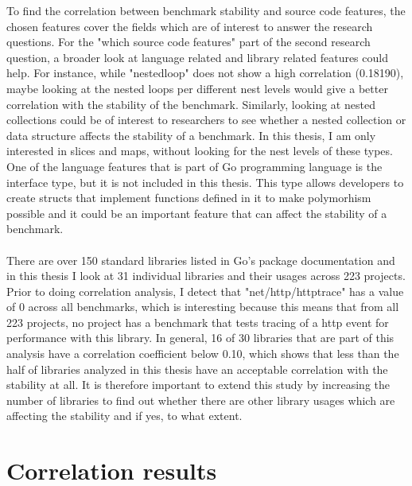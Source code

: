 \documentclass{seal_thesis}
\begin{document}
To find the correlation between benchmark stability and source code features, the chosen features cover the fields which are of interest to answer the research questions. For the "which source code features" part of the second research question, a broader look at language related and library related features could help. For instance, while "nestedloop" does not show a high correlation (0.18190), maybe looking at the nested loops per different nest levels would give a better correlation with the stability of the benchmark. Similarly, looking at nested collections could be of interest to researchers to see whether a nested collection or data structure affects the stability of a benchmark. In this thesis, I am only interested in slices and maps, without looking for the nest levels of these types. One of the language features that is part of Go programming language is the interface type, but it is not included in this thesis. This type allows developers to create structs that implement functions defined in it to make polymorhism possible and it could be an important feature that can affect the stability of a benchmark.\\
\\
There are over 150 standard libraries listed in Go's package documentation \cite{gopackages} and in this thesis I look at 31 individual libraries and their usages across 223 projects. Prior to doing correlation analysis, I detect that "net/http/httptrace" has a value of 0 across all benchmarks, which is interesting because this means that from all 223 projects, no project has a benchmark that tests tracing of a http event for performance with this library. In general, 16 of 30 libraries that are part of this analysis have a correlation coefficient below 0.10, which shows that less than the half of libraries analyzed in this thesis have an acceptable correlation with the stability at all. It is therefore important to extend this study by increasing the number of libraries to find out whether there are other library usages which are affecting the stability and if yes, to what extent.


\section{Correlation results}
\label{correlationreults}
\end{document}
